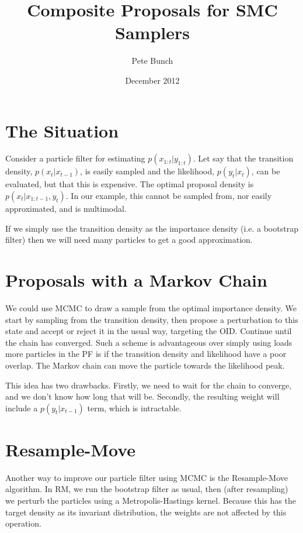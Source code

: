 \documentclass{article}
\title{Composite Proposals for SMC Samplers}
\author{Pete Bunch}
\date{December 2012}
\begin{document}
\maketitle

\section{The Situation}

Consider a particle filter for estimating $p(x_{1:t} | y_{1:t})$. Let say that the transition density, $p(x_t | x_{t-1})$, is easily sampled and the likelihood, $p(y_t | x_t)$, can be evaluated, but that this is expensive. The optimal proposal density is $p(x_t | x_{1:t-1}, y_t)$. In our example, this cannot be sampled from, nor easily approximated, and is multimodal.

If we simply use the transition density as the importance density (i.e. a bootstrap filter) then we will need many particles to get a good approximation.



\section{Proposals with a Markov Chain}

We could use MCMC to draw a sample from the optimal importance density. We start by sampling from the transition density, then propose a perturbation to this state and accept or reject it in the usual way, targeting the OID. Continue until the chain has converged. Such a scheme is advantageous over simply using loads more particles in the PF is if the transition density and likelihood have a poor overlap. The Markov chain can move the particle towards the likelihood peak.

This idea has two drawbacks. Firstly, we need to wait for the chain to converge, and we don't know how long that will be. Secondly, the resulting weight will include a $p(y_t | x_{t-1})$ term, which is intractable.



\section{Resample-Move}

Another way to improve our particle filter using MCMC is the Resample-Move algorithm. In RM, we run the bootstrap filter as usual, then (after resampling) we perturb the particles using a Metropolis-Hastings kernel. Because this has the target density as its invariant distribution, the weights are not affected by this operation.
\end{document}
